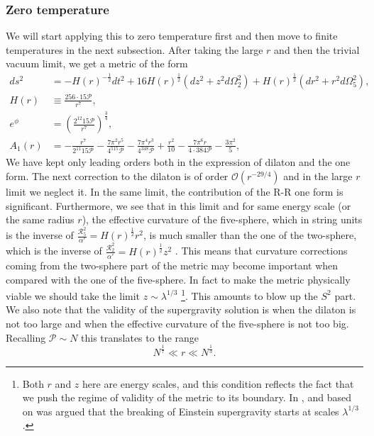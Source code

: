 \documentclass[11pt,english]{article}
\newcommand{\be}{\begin{equation}}
\newcommand{\ee}{\end{equation}}
\numberwithin{equation}{section}
\begin{document}
\subsubsection{Zero temperature}
We will start applying this to zero temperature first and then move to finite temperatures in the next subsection. After taking the large $r$ and then the trivial vacuum limit, we get a metric of the form 
\begin{align} \label{trivialvac}
ds^2&= -H(r)^{-\frac{1}{2}}dt^2+16H(r)^{\frac{1}{2}}\left(dz^2+z^2d\Omega_2^2\right)+H(r)^{\frac{1}{2}}\left(dr^2+r^2d\Omega_5^2\right),\\ H(r)&\equiv \frac{256\cdot 15\mathcal{P}}{r^7},\\
e^\phi&=\left(\frac{2^{12}15\mathcal{P}}{r^7}\right)^\frac{3}{4},%
\\
\label{oneform}A_1(r)&=-\frac{r^7}{2^{11}15\mathcal{P}}-\frac{7\pi^2 r^5}{4^515\mathcal{P}}-\frac{7\pi^4r^3}{4^348\mathcal{P}}+\frac{r^2}{10}-\frac{7\pi^6r}{4\cdot 384\mathcal{P}}-\frac{3\pi^2}{5},
\end{align}
\noindent
We have kept only leading orders both in the expression of dilaton and the one form. The next correction to the dilaton is of order $\mathcal{O}(r^{-29/4})$ and in the large $r$ limit we neglect it. In the same limit, the contribution of the R-R one form is significant. Furthermore, we see that in this limit and for same energy scale (or the same radius $r$), the effective curvature of the five-sphere, which in string units is the inverse of $\frac{\mathcal{R}_5^2}{\alpha'}=H(r)^{\frac{1}{2}}r^2$, is much smaller than the one of the two-sphere, which is the inverse of $\frac{\mathcal{R}_2^2}{\alpha'}=H(r)^{\frac{1}{2}}z^2$ . This means that curvature corrections coming from the two-sphere part of the metric may become important when compared with the one of the five-sphere. In fact to make the metric physically viable we should take the limit $z\sim \lambda^{1/3}$ \cite{Lin2006}\footnote{Both $r$ and $z$ here are energy scales, and this condition reflects the fact that we push the regime of validity of the metric to its boundary. In \cite{Maldacena2018}, and based on \cite{Polchinski1999} was argued that the breaking of Einstein supergravity starts at scales $\lambda^{1/3}$.}. This amounts to blow up the $S^2$ part.  We also note that the validity of the supergravity solution is when the dilaton is not too large and when the effective curvature of the five-sphere is not too big. Recalling $\mathcal{P}\sim N$ this translates to the range
\be \label{validsugra}
N^\frac{1}{7}\ll r\ll N^\frac{1}{3}.
\ee
 
\end{document}
